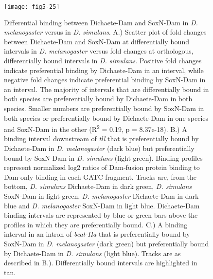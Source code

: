 \begin{figure}[H]
\centering
\texttt{[image: fig5-25]}
\caption{Differential binding between Dichaete-Dam and SoxN-Dam in \emph{D. melanogaster} versus in \emph{D. simulans}. A.) Scatter plot of fold changes between Dichaete-Dam and SoxN-Dam at differentially bound intervals in \emph{D. melanogaster} versus fold changes at orthologous, differentially bound intervals in \emph{D. simulans}. Positive fold changes indicate preferential binding by Dichaete-Dam in an interval, while negative fold changes indicate preferential binding by SoxN-Dam in an interval. The majority of intervals that are differentially bound in both species are preferentially bound by Dichaete-Dam in both species. Smaller numbers are preferentially bound by SoxN-Dam in both species or preferentially bound by Dichaete-Dam in one species and SoxN-Dam in the other (R\textsuperscript{2} = 0.19, p = 8.37e-18). B.) A binding interval downstream of \emph{tll} that is preferentially bound by Dichaete-Dam in \emph{D. melanogaster} (dark blue) but preferentially bound by SoxN-Dam in \emph{D. simulans} (light green). Binding profiles represent normalized log2 ratios of Dam-fusion protein binding to Dam-only binding in each GATC fragment. Tracks are, from the bottom, \emph{D. simulans} Dichaete-Dam in dark green, \emph{D. simulans} SoxN-Dam in light green, \emph{D. melanogaster} Dichaete-Dam in dark blue and \emph{D. melanogaster} SoxN-Dam in light blue. Dichaete-Dam binding intervals are represented by blue or green bars above the profiles in which they are preferentially bound. C.) A binding interval in an intron of \emph{beat-IIa} that is preferentially bound by SoxN-Dam in \emph{D. melanogaster} (dark green) but preferentially bound by Dichaete-Dam in \emph{D. simulans} (light blue). Tracks are as described in B.). Differentially bound intervals are highlighted in tan.}
\label{Figure 5.25}
\end{figure}

